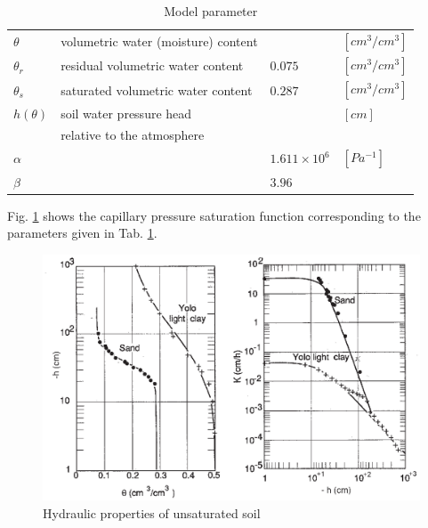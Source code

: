 %
\begin{table}[htb!]
\caption{Model parameter}
\label{tab:Haverkamp}
\begin{center}
\begin{tabular}{|l|l|l|l|}
\hline
$\theta$    & volumetric water (moisture) content &         & $[cm^3/cm^3]$ \\
$\theta_r$  & residual volumetric water content   & $0.075$ & $[cm^3/cm^3]$ \\
$\theta_s$  & saturated volumetric water content  & $0.287$ & $[cm^3/cm^3]$ \\
$h(\theta)$ & soil water pressure head            &         & $[cm]$ \\
            & relative to the atmosphere          &         & \\
$\alpha$    &                                     & $1.611\times 10^6$ & $[Pa^{-1}]$ \\
$\beta$     &                                     & $3.96$ & \\
\hline
\end{tabular}
\end{center}
\end{table}
%

Fig. \ref{fig:Haverkamp} shows the capillary pressure saturation function corresponding to the parameters given in Tab. \ref{tab:Haverkamp}.

\begin{figure}[htb!]
\begin{center}
\footnotesize
\includegraphics[width=0.95\columnwidth]{figures/haver1.eps}
\caption{Hydraulic properties of unsaturated soil
\cite{HavVauTouWieVac:77}} 
\label{fig:Haverkamp}
\end{center}
\end{figure}
%

